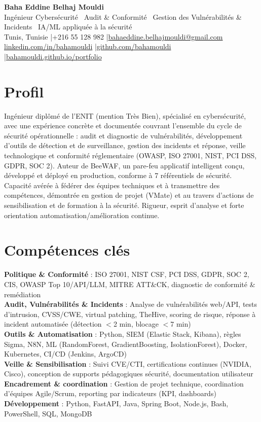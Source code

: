 \documentclass[a4paper,9pt]{article}
\begin{document}
\begin{center}
{\LARGE\bfseries\color{navy} Baha Eddine Belhaj Mouldi}\\[2pt]
{\normalsize\color{navy} Ingénieur Cybersécurité \textbar\ Audit \& Conformité \textbar\ Gestion des Vulnérabilités \& Incidents \textbar\ IA/ML appliquée à la sécurité}\\[3pt]
{\small Tunis, Tunisie \quad|\quad +216 55 128 982 \quad|\quad \href{mailto:bahaeddine.belhajmouldi@gmail.com}{bahaeddine.belhajmouldi@gmail.com}}\\[1pt]
{\small \href{https://www.linkedin.com/in/bahamouldi}{linkedin.com/in/bahamouldi} \quad|\quad \href{https://github.com/bahamouldi}{github.com/bahamouldi} \quad|\quad \href{https://bahamouldi.github.io/portfolio/}{bahamouldi.github.io/portfolio}}
\end{center}
\vspace{1pt}
\section{Profil}
Ingénieur diplômé de l'ENIT (mention Très Bien), spécialisé en cybersécurité, avec une expérience concrète et documentée couvrant l'ensemble du cycle de sécurité opérationnelle : audit et diagnostic de vulnérabilités, développement d'outils de détection et de surveillance, gestion des incidents et réponse, veille technologique et conformité réglementaire (OWASP, ISO 27001, NIST, PCI DSS, GDPR, SOC 2). Auteur de BeeWAF, un pare-feu applicatif intelligent conçu, développé et déployé en production, conforme à 7 référentiels de sécurité. Capacité avérée à fédérer des équipes techniques et à transmettre des compétences, démontrée en gestion de projet (VMate) et au travers d'actions de sensibilisation et de formation à la sécurité. Rigueur, esprit d'analyse et forte orientation automatisation/amélioration continue.
\section{Compétences clés}
\textbf{Politique \& Conformité} : ISO 27001, NIST CSF, PCI DSS, GDPR, SOC 2, CIS, OWASP Top 10/API/LLM, MITRE ATT\&CK, diagnostic de conformité \& remédiation\\[0.3pt]
\textbf{Audit, Vulnérabilités \& Incidents} : Analyse de vulnérabilités web/API, tests d'intrusion, CVSS/CWE, virtual patching, TheHive, scoring de risque, réponse à incident automatisée (détection $<$2 min, blocage $<$7 min)\\[0.3pt]
\textbf{Outils \& Automatisation} : Python, SIEM (Elastic Stack, Kibana), règles Sigma, N8N, ML (RandomForest, GradientBoosting, IsolationForest), Docker, Kubernetes, CI/CD (Jenkins, ArgoCD)\\[0.3pt]
\textbf{Veille \& Sensibilisation} : Suivi CVE/CTI, certifications continues (NVIDIA, Cisco), conception de supports pédagogiques sécurité, documentation utilisateur\\[0.3pt]
\textbf{Encadrement \& coordination} : Gestion de projet technique, coordination d'équipes Agile/Scrum, reporting par indicateurs (KPI, dashboards)\\[0.3pt]
\textbf{Développement} : Python, FastAPI, Java, Spring Boot, Node.js, Bash, PowerShell, SQL, MongoDB
\end{document}
